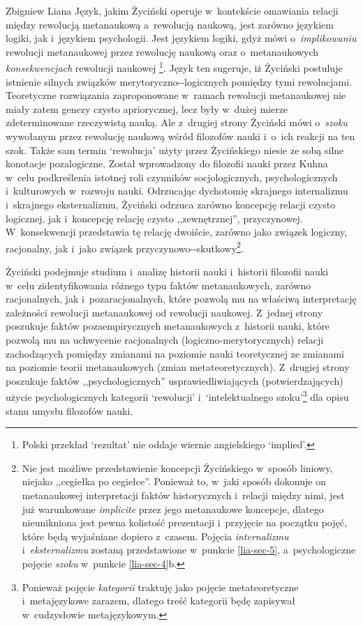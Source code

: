 \begin{artplenv}{Zbigniew Liana}
Język, jakim Życiński operuje w~kontekście omawiania relacji między rewolucją metanaukową a~rewolucją naukową, jest
zarówno językiem logiki, jak i~językiem psychologii. Jest językiem logiki, gdyż mówi o~\textit{implikowaniu} rewolucji
metanaukowej przez rewolucję naukową oraz o~metanaukowych \textit{konsekwencjach} rewolucji naukowej
\parencites[s.~8.13]{zycinski_structure_1988}[s.~15.24]{zycinski_struktura_2013}\footnote{Polski przekład `rezultat' nie oddaje
wiernie angielskiego `implied'.}. Język ten sugeruje, iż Życiński postuluje istnienie silnych związków
merytoryczno-\mbox{-logicznych} %
pomiędzy tymi rewolucjami. Teoretyczne rozwiązania zaproponowane w~ramach rewolucji
metanaukowej nie miały zatem genezy czysto apriorycznej, lecz były w~dużej mierze  zdeterminowane rzeczywistą nauką.
Ale z~drugiej strony Życiński mówi o~\textit{szoku} wywołanym przez rewolucję naukową wśród filozofów nauki i~o~ich
reakcji na ten szok. Także sam termin `rewolucja' użyty przez Życińskiego niesie ze sobą silne konotacje pozalogiczne.
Został wprowadzony do filozofii nauki przez Kuhna w~celu podkreślenia istotnej roli czynników socjologicznych,
psychologicznych i~kulturowych w~rozwoju nauki. Odrzucając dychotomię skrajnego internalizmu i~skrajnego eksternalizmu,
Życiński odrzuca zarówno koncepcję relacji czysto logicznej, jak i~koncepcję relację czysto ,,zewnętrznej'',
przyczynowej. W~konsekwencji przedstawia tę relację dwoiście, zarówno jako związek logiczny, racjonalny, jak i~jako związek
przyczynowo-\mbox{-skutkowy}\footnote{Nie %
jest możliwe przedstawienie koncepcji Życińskiego w~sposób liniowy, niejako ,,cegiełka
po cegiełce''. Ponieważ to, w~jaki sposób dokonuje on metanaukowej interpretacji faktów historycznych i~relacji między
nimi, jest już warunkowane \textit{implicite} przez jego metanaukowe koncepcje, dlatego nieunikniona jest pewna kolistość
prezentacji i~przyjęcie na początku pojęć, które będą wyjaśniane dopiero z~czasem. Pojęcia \textit{internalizmu} i~\textit{eksternalizmu}
zostaną przedstawione w~punkcie \ref{lia-sec-5}, a~psychologiczne pojęcie \textit{szoku} w~punkcie \ref{lia-sec-4}b.}.

Życiński podejmuje studium i~analizę historii nauki i~historii filozofii nauki w~celu zidentyfikowania różnego typu
faktów metanaukowych, zarówno racjonalnych, jak i~pozaracjonalnych, które pozwolą mu na właściwą interpretację zależności
rewolucji metanaukowej od rewolucji naukowej. Z~jednej strony poszukuje faktów pozaempirycznych metanaukowych z~historii
nauki, które pozwolą mu na uchwycenie racjonalnych (logiczno-merytorycznych) relacji zachodzących pomiędzy
zmianami na poziomie nauki teoretycznej ze zmianami na poziomie teorii metanaukowych (zmian metateoretycznych). Z~drugiej
strony poszukuje faktów ,,psychologicznych'' usprawiedliwiających (potwierdzających) użycie psychologicznych
kategorii `rewolucji' i~`intelektualnego szoku'\footnote{Ponieważ pojęcie \textit{kategorii} traktuję jako pojęcie
metateoretyczne i~metajęzykowe zarazem, dlatego treść kategorii będę zapisywał w~cudzysłowie metajęzykowym.} dla opisu
stanu umysłu filozofów nauki.


\end{artplenv}
